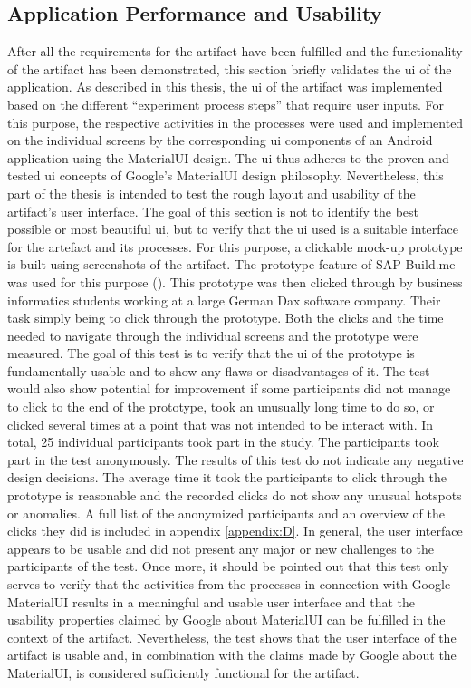 \subsection{Application Performance and Usability}

After all the requirements for the artifact have been fulfilled and the functionality of the artifact has been demonstrated, this section briefly validates the \ac{ui} of the application. As described in this thesis, the \ac{ui} of the artifact was implemented based on the different \enquote{experiment process steps} that require user inputs. For this purpose, the respective activities in the processes were used and implemented on the individual screens by the corresponding \ac{ui} components of an Android application using the MaterialUI design. The \ac{ui} thus adheres to the proven and tested \ac{ui} concepts of Google's MaterialUI design philosophy. Nevertheless, this part of the thesis is intended to test the rough layout and usability of the artifact's user interface. The goal of this section is not to identify the best possible or most beautiful \ac{ui}, but to verify that the \ac{ui} used is a suitable interface for the artefact and its processes. For this purpose, a clickable mock-up prototype is built using screenshots of the artifact. The prototype feature of SAP Build.me was used for this purpose (\cite{SAP.2023}). This prototype was then clicked through by business informatics students working at a large German Dax software company. Their task simply being to click through the prototype. Both the clicks and the time needed to navigate through the individual screens and the prototype were measured. The goal of this test is to verify that the \ac{ui} of the prototype is fundamentally usable and to show any flaws or disadvantages of it. The test would also show potential for improvement if some participants did not manage to click to the end of the prototype, took an unusually long time to do so, or clicked several times at a point that was not intended to be interact with. In total, 25 individual participants took part in the study. The participants took part in the test anonymously. The results of this test do not indicate any negative design decisions. The average time it took the participants to click through the prototype is reasonable and the recorded clicks do not show any unusual hotspots or anomalies. A full list of the anonymized participants and an overview of the clicks they did is included in appendix \ref{appendix:D}. In general, the user interface appears to be usable and did not present any major or new challenges to the participants of the test. Once more, it should be pointed out that this test only serves to verify that the activities from the processes in connection with Google MaterialUI results in a meaningful and usable user interface and that the usability properties claimed by Google about MaterialUI can be fulfilled in the context of the artifact. Nevertheless, the test shows that the user interface of the artifact is usable and, in combination with the claims made by Google about the MaterialUI, is considered sufficiently functional for the artifact. 